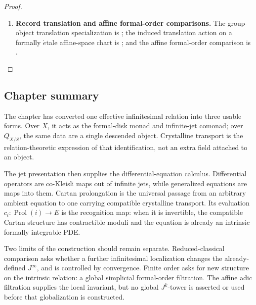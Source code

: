 \begin{proof}
\begin{enumerate}[label=\textup{(\arabic*)}]
    \item \textbf{Record translation and affine formal-order comparisons.}
The group-object translation specialization
is ; the induced translation action
on a formally \(\acute{e}\)tale affine-space chart is
; and the affine formal-order
comparison is .
\end{enumerate}
\end{proof}

\subsection{Chapter summary}
\label{sec:crystalline-jets-summary}

The chapter has converted one effective infinitesimal relation into three
usable forms. Over \(X\), it acts as the formal-disk monad and infinite-jet
comonad; over \(Q_{X/S}\), the same data are a single descended object.
Crystalline transport is the relation-theoretic expression of that
identification, not an extra field attached to an object.

The jet presentation then supplies the differential-equation calculus.
Differential operators are co-Kleisli maps out of infinite jets, while
generalized equations are maps into them. Cartan prolongation is the universal
passage from an arbitrary ambient equation to one carrying compatible
crystalline transport. Its evaluation
\(c_i:\operatorname{Prol}(i)\to E\) is the recognition map: when it is
invertible, the compatible Cartan structure has contractible moduli and the
equation is already an intrinsic formally integrable PDE.

Two limits of the construction should remain separate. Reduced-classical
comparison asks whether a further infinitesimal localization changes the
already-defined \(J^\infty\), and is controlled by convergence. Finite order
asks for new structure on the intrinsic relation: a global simplicial
formal-order filtration. The affine adic filtration supplies the local
invariant, but no global \(J^k\)-tower is asserted or used before that
globalization is constructed.
